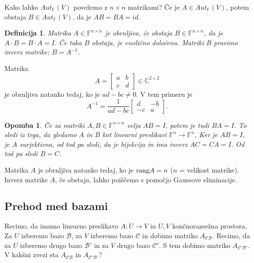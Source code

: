 \documentclass[10pt, a4paper]{article}
\newtheorem{defi}{Definicija}[section]
\newenvironment{noticeB}{%
  \tcolorbox[%
  notitle,
  empty,
  enhanced,  %
  breakable,
  coltext=black,
  colback=white, 
  fontupper=\rmfamily,
  parbox=false,
  noparskip,
  sharp corners,
  boxrule=-1pt,  %
  frame hidden,
  left=7pt,  %
  right=7pt,
  top=5pt,
  bottom=5pt,
  before skip=2.5ex plus 2pt,
  after skip=2.5ex plus 2pt,
  borderline west = {1.5pt}{-0.1pt}{blue!30!black}, %
  overlay unbroken and last={%
    \draw[color=black, line width=1.25pt]
    ($(frame.south west)+(1.pt, -0.1pt)$) -- ++(2em, 0);
  }
  ]}
{\endtcolorbox}
\newenvironment{definicija}{\begin{defi}\begin{noticeB}}{%
    \end{noticeB}\end{defi}}
\newtheorem*{opomba}{Opomba}
\newcommand{\C}{\mathbb {C}}
\newcommand{\F}{\mathbb {F}}
\newcommand{\rang}{\textup{\text{rang}}}
\begin{document}
Kako lahko $Aut_\F (V)$ povežemo z $n \times n$ matrikami?
Če je $A \in Aut_\F(V)$, potem obstaja $B \in Aut_\F (V)$, da je $AB = BA = id$.

\begin{definicija}
    Matrika $A \in \F^{n \times n}$ je obrnljiva, če obstaja $B \in \F^{n \times n}$, da je
    $A \cdot B = B \cdot A = I.$
    Če taka $B$ obstaja, je enolično določena. Matriki $B$ pravimo inverz matrike; $B = A^{-1}$.
\end{definicija}

Matrika $$A = \begin{bmatrix}
    a & b\\
    c & d
\end{bmatrix} \in \C^{2 \times 2}$$ je obrnljiva natanko tedaj, ko je $ad-bc \neq 0$.
V tem primeru je $$A^{-1} = \frac{1}{ad - bc} \begin{bmatrix}
    d & - b\\
    -c & a
\end{bmatrix}.$$

\begin{opomba}
    Če za matriki $A, B \in \F^{n \times n}$ velja $AB = I$, potem je tudi $BA = I$.
    To sledi iz tega, da gledamo $A$ in $B$ kot linearni preslikavi $\F^n \rightarrow \F^n$.
    Ker je $AB = I$, je $A$ surjektivna, od tod pa sledi, da je bijekcija in ima inverz $AC = CA = I$.
    Od tod pa sledi $B=C$.
\end{opomba}

Matrika $A$ je obrnljiva natanko tedaj, ko je $\rang A = n$ ($n$ = velikost matrike).
Inverz matrike $A$, če obstaja, lahko poiščemo s pomočjo Gaussove eliminacije.

\subsection{Prehod med bazami}

Recimo, da imamo linearno preslikavo $A: U \rightarrow V$ in $U,V$ končnorazsežna prostora.
Za $U$ izberemo bazo $\mathcal{B}$, za $V$ izberemo bazo $\mathcal{C}$ in dobimo matriko $A_\mathcal{CB}$.
Recimo, da za $U$ izberemo drugo bazo $\mathcal{B'}$ in za $V$ drugo bazo $\mathcal{C'}$.
S tem dobimo matriko $A_{\mathcal{C'B'}}$.
V kakšni zvezi sta $A_\mathcal{CB}$ in $A_\mathcal{C'B'}$?
\end{document}
